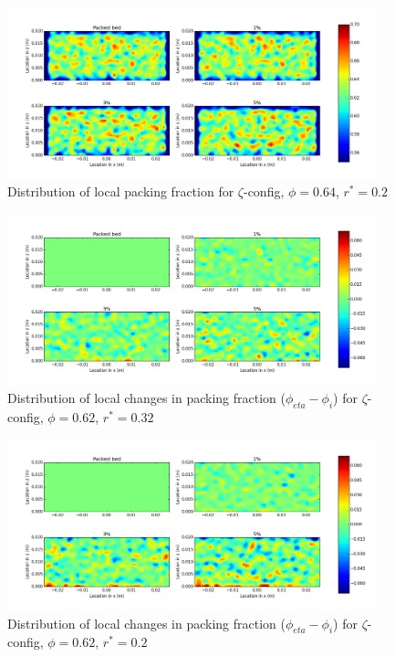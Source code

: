 \begin{figure}[!t]
    \centering
    \includegraphics[width = 0.95\textwidth]{figures/z-62-r125-1.png}
    \caption{Distribution of local packing fraction for $\zeta$-config, $\phi = 0.64$, $r^* = 0.2$}\label{fig:z-624r125}
\end{figure}



\begin{figure}[!t]
    \centering
    \includegraphics[width = 0.95\textwidth]{figures/z-62-r23-1-deltas.png}
    \caption{Distribution of local changes in packing fraction ($\phi_{eta} - \phi_i$) for $\zeta$-config, $\phi = 0.62$, $r^* = 0.32$}\label{fig:z-62-r23-deltas}
\end{figure}

\begin{figure}[!t]
    \centering
    \includegraphics[width = 0.95\textwidth]{figures/z-62-r125-1-deltas.png}
    \caption{Distribution of local changes in packing fraction ($\phi_{eta} - \phi_i$) for $\zeta$-config, $\phi = 0.62$, $r^* = 0.2$}\label{fig:z-62-r125-deltas}
\end{figure}

